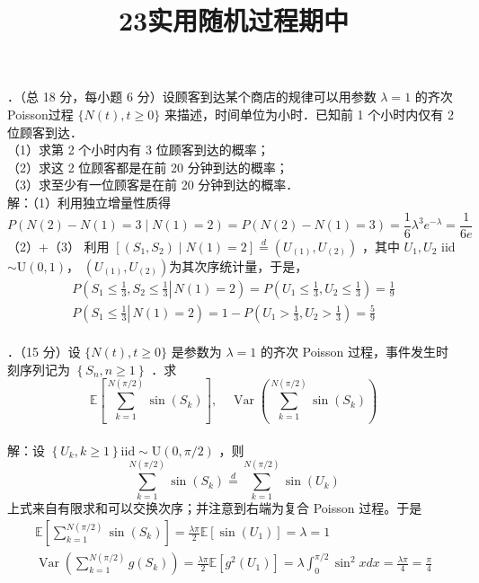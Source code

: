 \documentclass[UTF8]{ctexart}
\title{23实用随机过程期中}
\author{}
\date{}
\begin{document}
\maketitle
{}．（总 18 分，每小题 6 分）设顾客到达某个商店的规律可以用参数 $\lambda=1$ 的齐次 Poisson过程 $\{N(t), t \geq 0\}$ 来描述，时间单位为小时．已知前 1 个小时内仅有 2 位顾客到达．\\
（1）求第 2 个小时内有 3 位顾客到达的概率；\\
（2）求这 2 位顾客都是在前 20 分钟到达的概率；\\
（3）求至少有一位顾客是在前 20 分钟到达的概率．\\
解：（1）利用独立增量性质得
$$
P(N(2)-N(1)=3 \mid N(1)=2)=P(N(2)-N(1)=3)=\frac{1}{6} \lambda^{3} e^{-\lambda}=\frac{1}{6 e}
$$
（2）+（3） 利用 $\left[\left(S_{1}, S_{2}\right) \mid N(1)=2\right] \stackrel{d}{=}\left(U_{(1)}, U_{(2)}\right)$ ，其中 $U_{1}, U_{2}$ iid $\sim \mathrm{U}(0,1)$， $\left(U_{(1)}, U_{(2)}\right)$为其次序统计量，于是，
$$
\begin{gathered}
	P\left(S_{1} \leq \frac{1}{3}, \left.S_{2} \leq \frac{1}{3} \right\rvert\, N(1)=2\right)=P\left(U_{1} \leq \frac{1}{3}, U_{2} \leq \frac{1}{3}\right)=\frac{1}{9} \\
	P\left(\left.S_{1} \leq \frac{1}{3} \right\rvert\, N(1)=2\right)=1-P\left(U_{1}>\frac{1}{3}, U_{2}>\frac{1}{3}\right)=\frac{5}{9}
\end{gathered}
$$\\


．（15 分）设 $\{N(t), t \geq 0\}$ 是参数为 $\lambda=1$ 的齐次 Poisson 过程，事件发生时刻序列记为 $\left\{S_{n}, n \geq 1\right\}$ ．求
$$
\mathbb{E}\left[\sum_{k=1}^{N(\pi / 2)} \sin \left(S_{k}\right)\right], \quad \operatorname{Var}\left(\sum_{k=1}^{N(\pi / 2)} \sin \left(S_{k}\right)\right)
$$\\
解：设 $\left\{U_{k}, k \geq 1\right\} \mathrm{iid} \sim \mathrm{U}(0, \pi / 2)$ ，则
$$
\sum_{k=1}^{N(\pi / 2)} \sin \left(S_{k}\right) \stackrel{d}{=} \sum_{k=1}^{N(\pi / 2)} \sin \left(U_{k}\right)
$$
上式来自有限求和可以交换次序；并注意到右端为复合 Poisson 过程。于是
$$
\begin{gathered}
	\mathbb{E}\left[\sum_{k=1}^{N(\pi / 2)} \sin \left(S_{k}\right)\right]=\frac{\lambda \pi}{2} \mathbb{E}\left[\sin \left(U_{1}\right)\right]=\lambda=1 \\
	\operatorname{Var}\left(\sum_{k=1}^{N(\pi / 2)} g\left(S_{k}\right)\right)=\frac{\lambda \pi}{2} \mathbb{E}\left[g^{2}\left(U_{1}\right)\right]=\lambda \int_{0}^{\pi / 2} \sin ^{2} x d x=\frac{\lambda \pi}{4}=\frac{\pi}{4}
\end{gathered}
$$\\
\end{document}
